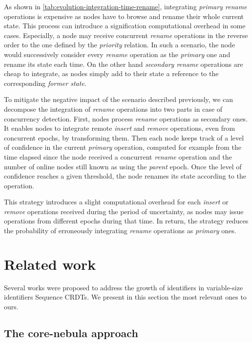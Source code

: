\documentclass[sigplan,10pt]{acmart}
\begin{document}
As shown in \autoref{tab:evolution-integration-time-rename}, integrating \emph{primary rename} operations is expensive as nodes have to browse and rename their whole current state.
This process can introduce a signification computational overhead in some cases.
Especially, a node may receive concurrent \emph{rename} operations in the reverse order to the one defined by the \emph{priority} relation.
In such a scenario, the node would successively consider every \emph{rename} operation as the \emph{primary} one and rename its state each time.
On the other hand \emph{secondary rename} operations are cheap to integrate, as nodes simply add to their state a reference to the corresponding \emph{former state}.

To mitigate the negative impact of the scenario described previously, we can decompose the integration of \emph{rename} operations into two parts in case of concurrency detection.
First, nodes process \emph{rename} operations as secondary ones.
It enables nodes to integrate remote \emph{insert} and \emph{remove} operations, even from concurrent epochs, by transforming them.
Then each node keeps track of a level of confidence in the current \emph{primary} operation, computed for example from the time elapsed since the node received a concurrent \emph{rename} operation and the number of online nodes still known as using the \emph{parent} epoch.
Once the level of confidence reaches a given threshold, the node renames its state according to the operation.

This strategy introduces a slight computational overhead for each \emph{insert} or \emph{remove} operations received during the period of uncertainty, as nodes may issue operations from different epochs during that time.
In return, the strategy reduces the probability of erroneously integrating \emph{rename} operations as \emph{primary} ones.

\section{Related work}

Several works were proposed to address the growth of identifiers in variable-size identifiers Sequence \acp{CRDT}.
We present in this section the most relevant ones to ours.

\subsection{The core-nebula approach}
\end{document}

